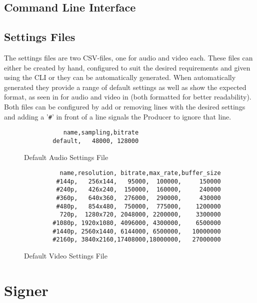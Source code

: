 \subsection{Command Line Interface\label{sec:cli_producer}}


\subsection{Settings Files\label{sec:settings}}

The settings files are two CSV-files, one for audio and video each. These files can either be created by hand, configured to suit the desired requirements and given using the CLI or they can be automatically generated. When automatically generated they provide a range of default settings as well as show the expected format, as seen in  for audio and video in  (both formatted for better readability). Both files can be configured by add or removing lines with the desired settings and adding a '\texttt{\#}' in front of a line signals the Producer to ignore that line.

\begin{figure}
    \centering
    \begin{lstlisting}
           name,sampling,bitrate
        default,   48000, 128000
    \end{lstlisting}
    \caption{Default Audio Settings File}
    \label{list:audio}
\end{figure}

\begin{figure}
    \centering
    \begin{lstlisting}
          name,resolution, bitrate,max_rate,buffer_size
         #144p,   256x144,   95000,  100000,     150000
         #240p,   426x240,  150000,  160000,     240000
         #360p,   640x360,  276000,  290000,     430000
         #480p,   854x480,  750000,  775000,    1200000
          720p,  1280x720, 2048000, 2200000,    3300000
        #1080p, 1920x1080, 4096000, 4300000,    6500000
        #1440p, 2560x1440, 6144000, 6500000,   10000000
        #2160p, 3840x2160,17408000,18000000,   27000000
    \end{lstlisting}
    \caption{Default Video Settings File}
    \label{list:video}
\end{figure}

\section{Signer\label{sec:signer}}

